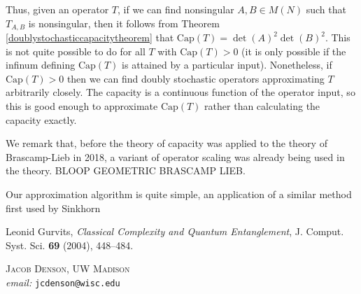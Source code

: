 \documentclass[12pt]{article}
\begin{document}
Thus, given an operator $T$, if we can find nonsingular $A,B \in M(N)$ such that $T_{A,B}$ is nonsingular, then it follows from Theorem \ref{doublystochasticcapacitytheorem} that $\text{Cap}(T) = \det(A)^2 \det(B)^2$. This is not quite possible to do for all $T$ with $\text{Cap}(T) > 0$ (it is only possible if the infinum defining $\text{Cap}(T)$ is attained by a particular input). Nonetheless, if $\text{Cap}(T) > 0$ then we can find doubly stochastic operators approximating $T$ arbitrarily closely. The capacity is a continuous function of the operator input, so this is good enough to approximate $\text{Cap}(T)$ rather than calculating the capacity exactly.

We remark that, before the theory of capacity was applied to the theory of Brascamp-Lieb in 2018, a variant of operator scaling was already being used in the theory. BLOOP GEOMETRIC BRASCAMP LIEB.

Our approximation algorithm is quite simple, an application of a similar method first used by Sinkhorn 

\begin{thebibliography}{3}

    Leonid Gurvits,
    \emph{Classical Complexity and Quantum Entanglement},
    J. Comput. Syst. Sci. {\bf 69} (2004), 448--484.

\end{thebibliography}

\noindent \textsc{Jacob Denson, UW Madison}\\
\textit{email:} \texttt{jcdenson@wisc.edu}
\end{document}
